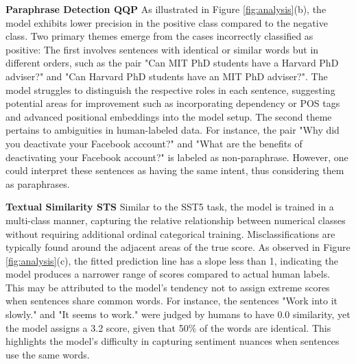 \documentclass{article}
\begin{document}
\textbf{Paraphrase Detection QQP} As illustrated in Figure \ref{fig:analysis}(b), the model 
exhibits lower precision in the positive class compared to the negative class. Two primary 
themes emerge from the cases incorrectly classified as positive: The first involves sentences 
with identical or similar words but in different orders, such as the pair "Can MIT PhD students 
have a Harvard PhD adviser?" and "Can Harvard PhD students have an MIT PhD adviser?". The model 
struggles to distinguish the respective roles in each sentence, suggesting potential areas for 
improvement such as incorporating dependency or POS tags and advanced positional embeddings into 
the model setup. The second theme pertains to ambiguities in human-labeled data. For instance, 
the pair "Why did you deactivate your Facebook account?" and "What are the benefits of 
deactivating your Facebook account?" is labeled as non-paraphrase. However, one could interpret 
these sentences as having the same intent, thus considering them as paraphrases.

\textbf{Textual Similarity STS} Similar to the SST5 task, the model is trained in a multi-class
manner, capturing the relative relationship between numerical classes without requiring
additional ordinal categorical training. Misclassifications are typically found around
the adjacent areas of the true score. As observed in Figure \ref{fig:analysis}(c), the fitted 
prediction line has a slope less than 1, indicating the model produces a narrower range
of scores compared to actual human labels. This may be attributed to the model's tendency not to 
assign extreme scores when sentences share common words. For instance, the sentences "Work into 
it slowly." and "It seems to work." were judged by humans to have 0.0 similarity, yet the model 
assigns a 3.2 score, given that 50\% of the words are identical. This 
highlights the model's difficulty in capturing sentiment 
nuances when sentences use the same words.


	
\end{document}
